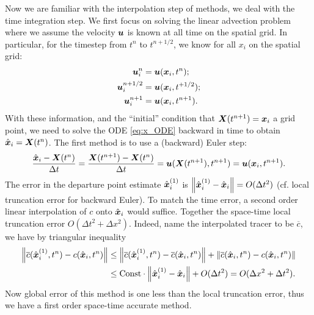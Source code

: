 \documentclass[11pt,letterpaper]{article}
\begin{document}
Now we are familiar with the interpolation step of \sml\;methods, we deal with the time integration step. We first focus on solving the linear advection problem where we assume the velocity $\boldsymbol{u}$ is known at all time on the spatial grid. In particular, for the timestep from $t^n$ to $t^{n+1/2}$, we know for all $x_i$ on the spatial grid:
\begin{align*}
    \boldsymbol{u}_i^{n} &= \boldsymbol{u}(\boldsymbol{x}_i,t^n);\\
    \boldsymbol{u}_i^{n+1/2} &= \boldsymbol{u}(\boldsymbol{x}_i,t^{+1/2});\\
    \boldsymbol{u}_i^{n+1} &= \boldsymbol{u}(\boldsymbol{x}_i,t^{n+1}).
\end{align*}
With these information, and the ``initial'' condition that $\boldsymbol{X}(t^{n+1}) = \boldsymbol{x}_i$ a grid point, we need to solve the ODE \eqref{eq:x_ODE} backward in time to obtain $\hat{\boldsymbol{x}}_i = \boldsymbol{X}(t^{n})$. The first method is to use a (backward) Euler step:
\begin{align*}
    \frac{\hat{\boldsymbol{x}}_i-\boldsymbol{X}(t^{n})}{\Delta t} = \frac{\boldsymbol{X}(t^{n+1})-\boldsymbol{X}(t^{n})}{\Delta t} = \boldsymbol{u}(\boldsymbol{X}(t^{n+1}),t^{n+1}) = \boldsymbol{u}(\boldsymbol{x}_i,t^{n+1}).
\end{align*}
The error in the departure point estimate $\hat{\boldsymbol{x}}^{(1)}_i$ is $\left\Vert \hat{\boldsymbol{x}}^{(1)}_i-\hat{\boldsymbol{x}}_i \right\Vert = O(\Delta t^2)$ (cf. local truncation error for backward Euler). To match the time error, a second order linear interpolation of $c$ onto $\hat{\boldsymbol{x}}_i$ would suffice. Together the space-time local truncation error $O(\Delta t^2+\Delta x^2)$. Indeed, name the interpolated tracer to be $\overline{c}$, we have by triangular inequality
\begin{align*}
    \left\Vert \overline{c}(\hat{\boldsymbol{x}}^{(1)}_i,t^n)-c(\hat{\boldsymbol{x}}_i,t^n) \right\Vert &\leq \left\Vert \overline{c}(\hat{\boldsymbol{x}}^{(1)}_i,t^n)-\overline{c}(\hat{\boldsymbol{x}}_i,t^n) \right\Vert+\left\Vert \overline{c}(\hat{\boldsymbol{x}}_i,t^n)-c(\hat{\boldsymbol{x}}_i,t^n) \right\Vert\\
    &\leq \text{Const}\cdot \left\Vert \hat{\boldsymbol{x}}^{(1)}_i-\hat{\boldsymbol{x}}_i \right\Vert+O(\Delta t^2) = O(\Delta x^2+\Delta t^2).
\end{align*}
Now global error of this method is one less than the local truncation error, thus we have a first order space-time accurate method. 
\end{document}
